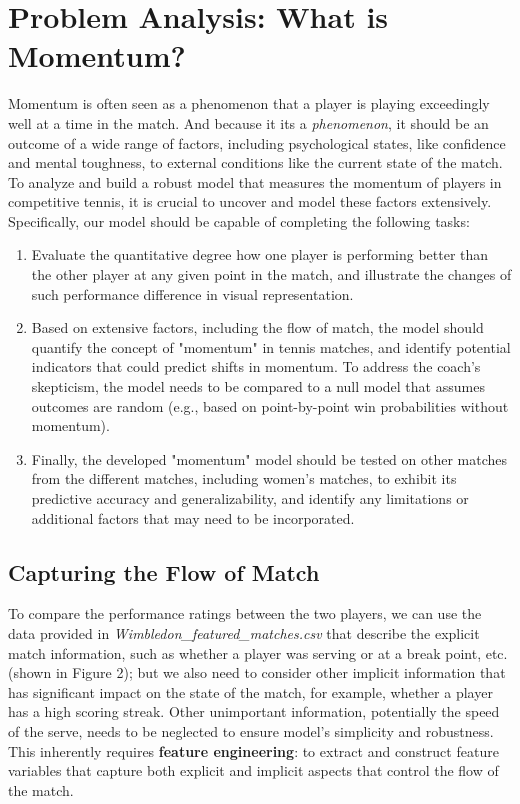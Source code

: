 \documentclass[12pt]{article}  %
\begin{document}
\section{Problem Analysis: What is Momentum?}

Momentum is often seen as a phenomenon that a player is playing exceedingly well at a time in the match. And because it its a \textit{phenomenon}, it should be an outcome of a wide range of factors, including psychological states, like confidence and mental toughness, to external conditions like the current state of the match. To analyze and build a robust model that measures the momentum of players in competitive tennis, it is crucial to uncover and model these factors extensively. Specifically, our model should be capable of completing the following tasks:

\begin{enumerate}[\bfseries (1)]
	\setlength{\parsep}{0ex} %
	\setlength{\topsep}{0ex} %
	\setlength{\itemsep}{0ex} %
	\item Evaluate the quantitative degree how one player is performing better than the other player at any given point in the match, and illustrate the changes of such performance difference in visual representation.
	\item Based on extensive factors, including the flow of match, the model should quantify the concept of "momentum" in tennis matches, and identify potential indicators that could predict shifts in momentum. To address the coach’s skepticism, the model needs to be compared to a null model that assumes outcomes are random (e.g., based on point-by-point win probabilities without momentum).
	\item Finally, the developed "momentum" model should be tested on other matches from the different matches, including women's matches, to exhibit its predictive accuracy and generalizability, and identify any limitations or additional factors that may need to be incorporated. 
\end{enumerate}

\subsection{Capturing the Flow of Match}
To compare the performance ratings between the two players, we can use the data provided in \textit{Wimbledon\_featured\_matches.csv} that describe the explicit match information, such as whether a player was serving or at a break point, etc. (shown in Figure 2); but we also need to consider other implicit information that has significant impact on the state of the match, for example, whether a player has a high scoring streak. Other unimportant information, potentially the speed of the serve, needs to be neglected to ensure model's simplicity and robustness. This inherently requires \textbf{feature engineering}: to extract and construct feature variables that capture both explicit and implicit aspects that control the flow of the match.
\end{document}

